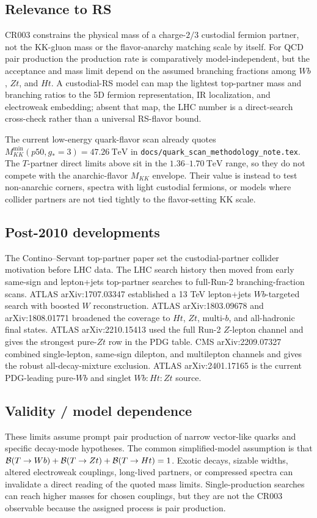 \subsection*{Relevance to RS}
CR003 constrains the physical mass of a charge-\(2/3\) custodial fermion
partner, not the KK-gluon mass or the flavor-anarchy matching scale by itself.
For QCD pair production the production rate is comparatively model-independent,
but the acceptance and mass limit depend on the assumed branching fractions
among \(Wb\), \(Zt\), and \(Ht\).  A custodial-RS model can map the lightest
top-partner mass and branching ratios to the 5D fermion representation, IR
localization, and electroweak embedding; absent that map, the LHC number is a
direct-search cross-check rather than a universal RS-flavor bound.

The current low-energy quark-flavor scan already quotes
\(M_{KK}^{\min}(p50,g_\ast=3)=47.26~\mathrm{TeV}\) in
\texttt{docs/quark\_scan\_methodology\_note.tex}.  The \(T\)-partner direct
limits above sit in the \(1.36\)--\(1.70~\mathrm{TeV}\) range, so they do not
compete with the anarchic-flavor \(M_{KK}\) envelope.  Their value is instead
to test non-anarchic corners, spectra with light custodial fermions, or models
where collider partners are not tied tightly to the flavor-setting KK scale.

\subsection*{Post-2010 developments}
The Contino--Servant top-partner paper set the custodial-partner collider
motivation before LHC data.  The LHC search history then moved from early
same-sign and lepton+jets top-partner searches to full-Run-2
branching-fraction scans.  ATLAS arXiv:1707.03347 established a 13 TeV
lepton+jets \(Wb\)-targeted search with boosted \(W\) reconstruction.  ATLAS
arXiv:1803.09678 and arXiv:1808.01771 broadened the coverage to \(Ht\),
\(Zt\), multi-\(b\), and all-hadronic final states.  ATLAS arXiv:2210.15413
used the full Run-2 \(Z\)-lepton channel and gives the strongest pure-\(Zt\)
row in the PDG table.  CMS arXiv:2209.07327 combined single-lepton,
same-sign dilepton, and multilepton channels and gives the robust
all-decay-mixture exclusion.  ATLAS arXiv:2401.17165 is the current
PDG-leading pure-\(Wb\) and singlet \(Wb:Ht:Zt\) source.

\subsection*{Validity / model dependence}
These limits assume prompt pair production of narrow vector-like quarks and
specific decay-mode hypotheses.  The common simplified-model assumption is
that \({\cal B}(T\to Wb)+{\cal B}(T\to Zt)+{\cal B}(T\to Ht)=1\).  Exotic
decays, sizable widths, altered electroweak couplings, long-lived partners, or
compressed spectra can invalidate a direct reading of the quoted mass limits.
Single-production searches can reach higher masses for chosen couplings, but
they are not the CR003 observable because the assigned process is pair
production.

